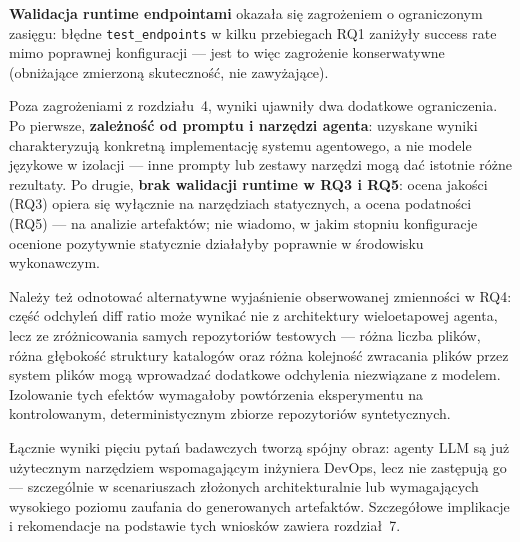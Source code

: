 \textbf{Walidacja runtime endpointami} okazała się zagrożeniem o ograniczonym zasięgu: błędne \texttt{test\_endpoints} w kilku przebiegach RQ1 zaniżyły success rate mimo poprawnej konfiguracji — jest to więc zagrożenie konserwatywne (obniżające zmierzoną skuteczność, nie zawyżające).

Poza zagrożeniami z rozdziału~4, wyniki ujawniły dwa dodatkowe ograniczenia. Po pierwsze, \textbf{zależność od promptu i narzędzi agenta}: uzyskane wyniki charakteryzują konkretną implementację systemu agentowego, a nie modele językowe w izolacji — inne prompty lub zestawy narzędzi mogą dać istotnie różne rezultaty. Po drugie, \textbf{brak walidacji runtime w RQ3 i RQ5}: ocena jakości (RQ3) opiera się wyłącznie na narzędziach statycznych, a ocena podatności (RQ5) — na analizie artefaktów; nie wiadomo, w jakim stopniu konfiguracje ocenione pozytywnie statycznie działałyby poprawnie w środowisku wykonawczym.

Należy też odnotować alternatywne wyjaśnienie obserwowanej zmienności w RQ4: część odchyleń diff ratio może wynikać nie z architektury wieloetapowej agenta, lecz ze zróżnicowania samych repozytoriów testowych — różna liczba plików, różna głębokość struktury katalogów oraz różna kolejność zwracania plików przez system plików mogą wprowadzać dodatkowe odchylenia niezwiązane z modelem. Izolowanie tych efektów wymagałoby powtórzenia eksperymentu na kontrolowanym, deterministycznym zbiorze repozytoriów syntetycznych.

Łącznie wyniki pięciu pytań badawczych tworzą spójny obraz: agenty LLM są już użytecznym narzędziem wspomagającym inżyniera DevOps, lecz nie zastępują go — szczególnie w scenariuszach złożonych architekturalnie lub wymagających wysokiego poziomu zaufania do generowanych artefaktów. Szczegółowe implikacje i rekomendacje na podstawie tych wniosków zawiera rozdział~7.

